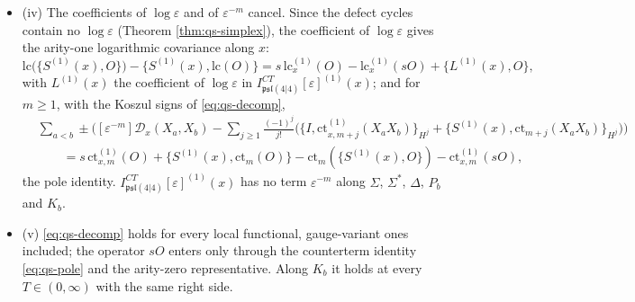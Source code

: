 \begin{theorem}
\begin{itemize}
\begin{equation}
\label{eq:qs-decomp}
\end{equation}
the two-body kernel $\Upsilon_x$ of Definition \ref{def:qs-defect} (iv) summed over the unordered pairs of letters, and a one-body term, the bracket with the arity-one finite counterterm along $x$, a derivation of the letters.
\item (iv) The coefficients of $\log\varepsilon$ and of $\varepsilon^{-m}$ cancel. Since the defect cycles contain no $\log\varepsilon$ (Theorem \ref{thm:qs-simplex}), the coefficient of $\log\varepsilon$ gives the arity-one logarithmic covariance along $x$:
\begin{equation}
\mathrm{lc}\big(\{S^{(1)}(x),O\}\big)-\big\{S^{(1)}(x),\mathrm{lc}(O)\big\}=s\,\mathrm{lc}^{(1)}_x(O)-\mathrm{lc}^{(1)}_x(sO)+\big\{L^{(1)}(x),O\big\},
\label{eq:qs-logcov}
\end{equation}
with $L^{(1)}(x)$ the coefficient of $\log\varepsilon$ in $I^{CT}_{\mathfrak{psl}(4|4)}[\varepsilon]^{(1)}(x)$; and for $m\ge1$, with the Koszul signs of \eqref{eq:qs-decomp},
\begin{equation}
\begin{aligned}
&\sum_{a<b}\pm\Big([\varepsilon^{-m}]\mathcal D_x(X_a,X_b)-\sum_{j\ge1}\tfrac{(-1)^j}{j!}\Big(\big\{I,\mathrm{ct}^{(1)}_{x,m+j}(X_aX_b)\big\}_{H^j}+\big\{S^{(1)}(x),\mathrm{ct}_{m+j}(X_aX_b)\big\}_{H^j}\Big)\Big)\\
&\qquad=s\,\mathrm{ct}^{(1)}_{x,m}(O)+\{S^{(1)}(x),\mathrm{ct}_m(O)\}-\mathrm{ct}_m(\{S^{(1)}(x),O\})-\mathrm{ct}^{(1)}_{x,m}(sO),
\end{aligned}
\label{eq:qs-pole}
\end{equation}
the pole identity. $I^{CT}_{\mathfrak{psl}(4|4)}[\varepsilon]^{(1)}(x)$ has no term $\varepsilon^{-m}$ along $\Sigma$, $\Sigma^*$, $\Delta$, $P_b$ and $K_b$.
\item (v) \eqref{eq:qs-decomp} holds for every local functional, gauge-variant ones included; the operator $sO$ enters only through the counterterm identity \eqref{eq:qs-pole} and the arity-zero representative. Along $K_b$ it holds at every $T\in(0,\infty)$ with the same right side.
\end{itemize}
\end{theorem}

